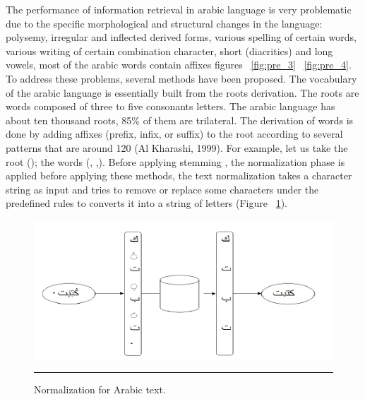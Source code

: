 The performance of information retrieval in arabic language is very problematic due to the specific morphological and structural changes in the language: polysemy, irregular and inflected derived forms, various spelling of certain words, various writing of certain combination character, short (diacritics) and long vowels, most of the arabic words contain affixes figures ~\ref{fig:pre_3} ~\ref{fig:pre_4}. To address these problems, several methods have been proposed.
The vocabulary of the arabic language is essentially built from the roots derivation. The roots are words composed of three to five consonants letters. The arabic language has about ten thousand roots, 85\% of them are trilateral. The derivation of words is done by adding affixes (prefix, infix, or suffix) to the root according to several patterns that are around 120 (Al Kharashi, 1999). For example, let us take the root (); the words (, ,).
Before applying stemming , the normalization phase is applied before applying these methods, the text normalization takes a character string as input and tries to remove or replace some characters under the predefined rules to converts it into a string of letters (Figure ~\ref{fig:pre_1}).

\begin{figure}[htbp]
	\centering
		\includegraphics{./Figures/pre_1.png}
		\rule{35em}{0.5pt}
	\caption[Normalization for Arabic text.]{Normalization for Arabic text.}
	\label{fig:pre_1}
\end{figure}

